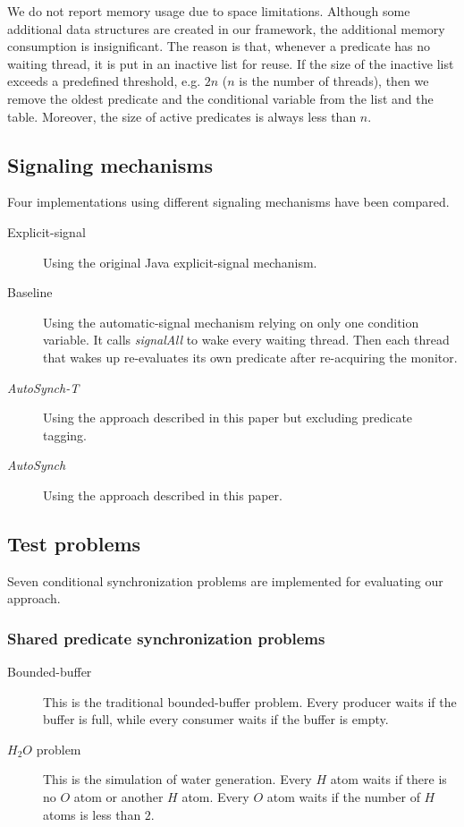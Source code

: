 \documentclass{sigplanconf}
\begin{document}
We do not 
report memory usage due to space limitations. Although some additional data 
structures are created in our framework, the additional memory consumption is 
insignificant. The reason is that, whenever a predicate has no waiting thread, 
it is put in an inactive list for reuse. If the size of the inactive list 
exceeds a predefined threshold, e.g. $2n$ ($n$ is the number of threads), then 
we remove the oldest predicate and the conditional variable from the list and 
the table.  Moreover, the size of active predicates is always less than $n$. 

\subsection{Signaling mechanisms}
Four implementations using different signaling mechanisms have been 
compared. 
\begin{description}
    \item[Explicit-signal] Using the original Java explicit-signal mechanism. 
    \item[Baseline] Using the automatic-signal mechanism relying on only
        one condition variable. It calls {\em signalAll} to wake
        every waiting thread. Then each thread that wakes up re-evaluates its 
        own predicate after re-acquiring the monitor.
    \item[{\em AutoSynch-T}] Using the approach described in this paper but excluding
        predicate tagging. 
    \item[{\em AutoSynch}] Using the approach described in this paper. 
\end{description}

\subsection{Test problems}
Seven conditional synchronization problems are implemented for evaluating our
approach. 

\subsubsection{Shared predicate synchronization problems}
\begin{description}
    \item[Bounded-buffer \cite{dijk65, dijk71}] This is the traditional 
        bounded-buffer problem. Every producer waits if the buffer is full,
        while every consumer waits if the buffer is empty. 
    \item [$H_2O$ problem \cite{and00}] This is the simulation of water
        generation. Every $H$ atom waits if there is no $O$ atom or another $H$
        atom. Every $O$ atom waits if the number of $H$ atoms is less than $2$. 
\end{description}
\end{document}
